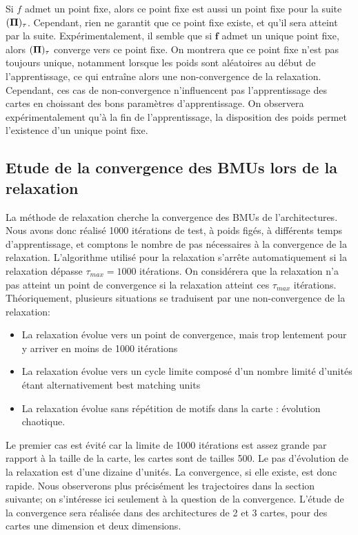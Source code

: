 Si $f$ admet un point fixe, alors ce point fixe est aussi un point fixe pour la suite $(\mathbf{\Pi})_\tau$. Cependant, rien ne garantit que ce point fixe existe, et qu'il sera atteint par la suite.
Expérimentalement, il semble que si $\mathbf{f}$ admet un unique point fixe, alors $(\mathbf{\Pi})_{\tau}$ converge vers ce point fixe. On montrera que ce point fixe n'est pas toujours unique, notamment lorsque les poids sont aléatoires au début de l'apprentissage, ce qui entraîne alors une non-convergence de la relaxation. Cependant, ces cas de non-convergence n'influencent pas l'apprentissage des cartes en choissant des bons paramètres d'apprentissage. On observera expérimentalement qu'à la fin de l'apprentissage, la disposition des poids permet l'existence d'un unique point fixe. 


\subsection{Etude de la convergence des BMUs lors de la relaxation}

La méthode de relaxation cherche la convergence des BMUs de l'architectures. Nous avons donc réalisé 1000 itérations de test, à poids figés, à différents temps d'apprentissage, et comptons le nombre de pas nécessaires à la convergence de la relaxation. L'algorithme utilisé pour la relaxation s'arrête automatiquement si la relaxation dépasse $\tau_{max}= 1000$ itérations. On considérera que la relaxation n'a pas atteint un point de convergence si la relaxation atteint ces $\tau_{max}$ itérations.
Théoriquement, plusieurs situations se traduisent par une non-convergence de la relaxation:
\begin{itemize}
\item La relaxation évolue vers un point de convergence, mais trop lentement pour y arriver en moins de 1000 itérations
\item La relaxation évolue vers un cycle limite composé d'un nombre limité d'unités étant alternativement best matching units
\item La relaxation évolue sans répétition de motifs dans la carte : évolution chaotique.
\end{itemize}
Le premier cas est évité car la limite de 1000 itérations est assez grande par rapport à la taille de la carte, les cartes sont de tailles 500. Le pas d'évolution de la relaxation est d'une dizaine d'unités. La convergence, si elle existe, est donc rapide. Nous observerons plus précisément les trajectoires dans la section suivante; on s'intéresse ici seulement à la question de la convergence.
L'étude de la convergence sera réalisée dans des architectures de 2 et 3 cartes, pour des cartes une dimension et deux dimensions.

